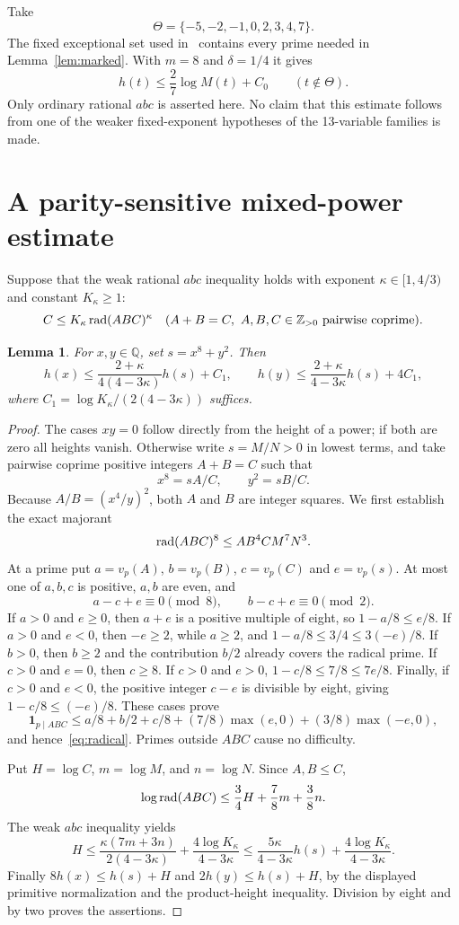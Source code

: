 \documentclass[11pt,a4paper]{article}
\newtheorem{lemma}[theorem]{Lemma}
\theoremstyle{remark}\newtheorem{remark}[theorem]{Remark}
\newcommand{\Q}{\mathbb Q}\newcommand{\Z}{\mathbb Z}
\begin{document}
Take
\[
 \Theta=\{-5,-2,-1,0,2,3,4,7\}.
\]
The fixed exceptional set used in~\cite{Parent} contains every prime
needed in Lemma~\ref{lem:marked}. With $m=8$ and $\delta=1/4$ it gives
\begin{equation}\label{eq:contact}
 h(t)\le\frac27\log M(t)+C_0\qquad(t\notin\Theta).
\end{equation}
Only ordinary rational $abc$ is asserted here. No claim that this
estimate follows from one of the weaker fixed-exponent hypotheses of
the 13-variable families is made.

\section{A parity-sensitive mixed-power estimate}
Suppose that the weak rational $abc$ inequality holds with exponent
$\kappa\in[1,4/3)$ and constant $K_\kappa\ge1$:
\[
 C\le K_\kappa\rad(ABC)^\kappa
 \quad(A+B=C,\ A,B,C\in\Z_{>0}\text{ pairwise coprime}).
\]

\begin{lemma}\label{lem:mixed}
For $x,y\in\Q$, set $s=x^8+y^2$. Then
\[
 h(x)\le \frac{2+\kappa}{4(4-3\kappa)}h(s)+C_1,
 \qquad
 h(y)\le \frac{2+\kappa}{4-3\kappa}h(s)+4C_1,
\]
where $C_1=\log K_\kappa/(2(4-3\kappa))$ suffices.
\end{lemma}
\begin{proof}
The cases $xy=0$ follow directly from the height of a power; if both
are zero all heights vanish. Otherwise write $s=M/N>0$ in lowest
terms, and take pairwise coprime positive integers $A+B=C$ such that
\[
 x^8=sA/C,\qquad y^2=sB/C.
\]
Because $A/B=(x^4/y)^2$, both $A$ and $B$ are integer squares.
We first establish the exact majorant
\begin{equation}\label{eq:radical}
 \operatorname{rad}(ABC)^8\le A B^4 C M^7 N^3.
\end{equation}
At a prime put $a=v_p(A)$, $b=v_p(B)$, $c=v_p(C)$ and
$e=v_p(s)$. At most one of $a,b,c$ is positive, $a,b$ are even, and
\[
 a-c+e\equiv0\pmod8,\qquad b-c+e\equiv0\pmod2.
\]
If $a>0$ and $e\ge0$, then $a+e$ is a positive multiple of eight,
so $1-a/8\le e/8$. If $a>0$ and $e<0$, then $-e\ge2$, while
$a\ge2$, and $1-a/8\le3/4\le3(-e)/8$.
If $b>0$, then $b\ge2$ and the contribution $b/2$ already covers the
radical prime. If $c>0$ and $e=0$, then $c\ge8$. If $c>0$ and $e>0$,
$1-c/8\le7/8\le7e/8$. Finally, if $c>0$ and $e<0$, the positive
integer $c-e$ is divisible by eight, giving
$1-c/8\le(-e)/8$. These cases prove
\[
 {\boldsymbol 1}_{p\mid ABC}
 \le a/8+b/2+c/8+(7/8)\max(e,0)+(3/8)\max(-e,0),
\]
and hence~\eqref{eq:radical}. Primes outside $ABC$ cause no difficulty.

Put $H=\log C$, $m=\log M$, and $n=\log N$. Since $A,B\le C$,
\[
 \log\operatorname{rad}(ABC)\le\frac34H+\frac78m+\frac38n.
\]
The weak $abc$ inequality yields
\[
 H\le\frac{\kappa(7m+3n)}{2(4-3\kappa)}
        +\frac{4\log K_\kappa}{4-3\kappa}
 \le\frac{5\kappa}{4-3\kappa}h(s)
        +\frac{4\log K_\kappa}{4-3\kappa}.
\]
Finally $8h(x)\le h(s)+H$ and $2h(y)\le h(s)+H$, by the displayed
primitive normalization and the product-height inequality. Division
by eight and by two proves the assertions.
\end{proof}
\end{document}
